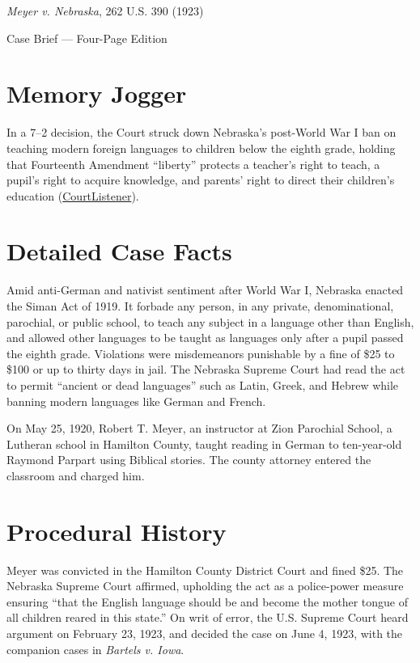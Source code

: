 \documentclass[12pt]{article}
\begin{document}
\begin{center}
{\LARGE \textit{Meyer v. Nebraska}, 262 U.S. 390 (1923)\par}
\vspace{0.8em}
{\large Case Brief --- Four-Page Edition\par}
\end{center}
\vspace{1em}

\section{Memory Jogger}

In a 7--2 decision, the Court struck down Nebraska's post-World War I ban on teaching modern foreign languages to children below the eighth grade, holding that Fourteenth Amendment ``liberty'' protects a teacher's right to teach, a pupil's right to acquire knowledge, and parents' right to direct their children's education (\href{https://www.courtlistener.com/opinion/100233/meyer-v-nebraska/}{CourtListener}).

\section{Detailed Case Facts}

Amid anti-German and nativist sentiment after World War I, Nebraska enacted the Siman Act of 1919. It forbade any person, in any private, denominational, parochial, or public school, to teach any subject in a language other than English, and allowed other languages to be taught as languages only after a pupil passed the eighth grade. Violations were misdemeanors punishable by a fine of \$25 to \$100 or up to thirty days in jail. The Nebraska Supreme Court had read the act to permit ``ancient or dead languages'' such as Latin, Greek, and Hebrew while banning modern languages like German and French.

On May 25, 1920, Robert T. Meyer, an instructor at Zion Parochial School, a Lutheran school in Hamilton County, taught reading in German to ten-year-old Raymond Parpart using Biblical stories. The county attorney entered the classroom and charged him.

\section{Procedural History}

Meyer was convicted in the Hamilton County District Court and fined \$25. The Nebraska Supreme Court affirmed, upholding the act as a police-power measure ensuring ``that the English language should be and become the mother tongue of all children reared in this state.'' On writ of error, the U.S. Supreme Court heard argument on February 23, 1923, and decided the case on June 4, 1923, with the companion cases in \textit{Bartels v. Iowa}.
\end{document}
